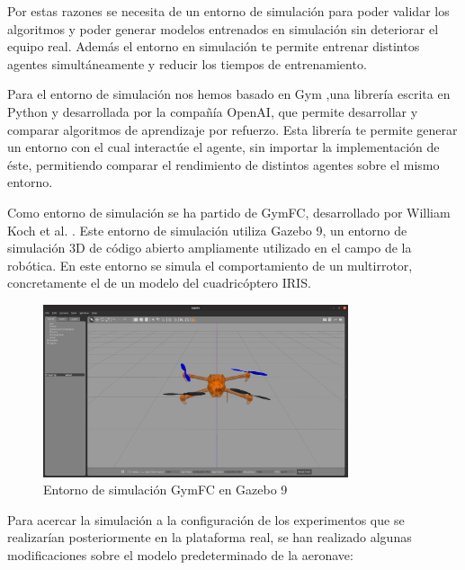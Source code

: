 Por estas razones se necesita de un entorno de simulación para poder validar los algoritmos y poder generar modelos entrenados en simulación sin deteriorar el equipo real. Además el entorno en simulación te permite entrenar distintos agentes simultáneamente y reducir los tiempos de entrenamiento.

Para el entorno de simulación nos hemos basado en Gym \cite{brockman2016openai},una librería escrita en Python y desarrollada por la compañía OpenAI, que permite desarrollar y comparar algoritmos de aprendizaje por refuerzo. Esta librería te permite generar un entorno con el cual interactúe el agente, sin importar la implementación de éste, permitiendo comparar el rendimiento de distintos agentes sobre el mismo entorno.

Como entorno de simulación se ha partido de GymFC, desarrollado por William Koch et al. \cite{koch2019reinforcement}.
Este entorno de simulación utiliza Gazebo 9, un entorno de simulación 3D de código abierto ampliamente utilizado en el campo de la robótica. En este entorno se simula el comportamiento de un multirrotor, concretamente el de un modelo del cuadricóptero IRIS.

\begin{figure}[htb!]
	\centering
	\includegraphics[width=0.8\textwidth]{software/gymfc}
	\caption{Entorno de simulación GymFC en Gazebo 9}
	\label{d}
\end{figure}

Para acercar la simulación a la configuración de los experimentos que se realizarían posteriormente en la plataforma real, se han realizado algunas modificaciones sobre el modelo predeterminado de la aeronave:

